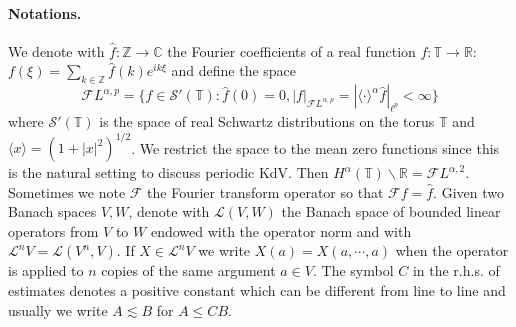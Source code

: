 \documentclass[a4paper,11pt,reqno]{article}
\newcommand{\RR}{\mathbb{R}}
\newcommand{\TT}{\mathbb{T}}
\newcommand{\bbC}{\mathbb{C}}
\newcommand{\FF}{\mathcal{F}}
\newcommand{\LL}{\mathcal{L}}
\newcommand{\ZZ}{\mathbb{Z}}
\newcommand{\wh}{\widehat}
\begin{document}
\paragraph{Notations.}
 We denote with
$\wh f: \ZZ \to \bbC$ the Fourier coefficients of a real function $f : \TT \to
\RR$:
$
f(\xi) = \sum_{k \in \ZZ} \hat f(k) e^{i k \xi}
$
and define the space $$
\FF L^{\alpha,p} = \{ f \in \mathcal{S}'(\TT) : \hat f(0)=0, |f|_{\FF L^{\alpha,p}}=|\langle \cdot \rangle^\alpha \hat f |_{\ell^p} < \infty \}
$$
where $ \mathcal{S}'(\TT)$ is the space of real Schwartz distributions on the torus $\TT$ and $\langle x \rangle = (1+|x|^2)^{1/2}$. We restrict the space to the mean zero functions since this is the natural setting to discuss periodic KdV.
 Then $H^\alpha(\TT)\backslash \RR = \FF L^{\alpha,2}$.  Sometimes we note $\FF$ the Fourier transform operator so that $\FF f  = \hat f$. Given two Banach spaces $V,W$, denote with $\LL(V,W)$ the Banach space of bounded linear operators from $V$ to $W$ endowed with the operator norm and with $\LL^n V = \LL(V^n, V)$. If $X \in \LL^n V$ we  write $X(a) = X(a,\cdots,a)$ when the operator is applied to $n$ copies of the same argument $a\in V$.  
The symbol $C$ in the r.h.s. of  estimates denotes a positive constant which can be different from line to line and usually we write $A \lesssim B$ for $A \le C B$.


\bigskip
\end{document}
